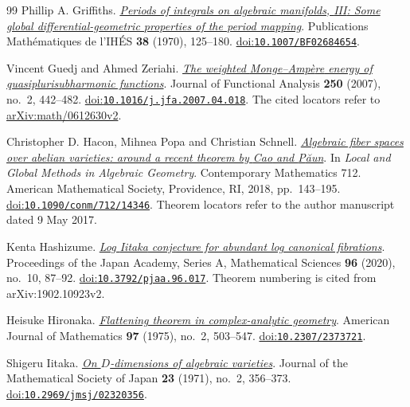 \begin{thebibliography}{99}
Phillip A. Griffiths.
\emph{\href{https://www.numdam.org/item/PMIHES_1970__38__125_0/}{Periods of integrals on algebraic manifolds, {III}: Some global differential-geometric properties of the period mapping}}.
Publications Math{\'e}matiques de l'IH{\'E}S \textbf{38} (1970), 125--180.
\href{https://doi.org/10.1007/BF02684654}{doi:\nolinkurl{10.1007/BF02684654}}.

Vincent Guedj and Ahmed Zeriahi.
\emph{\href{https://arxiv.org/abs/math/0612630v2}{The weighted {Monge--Amp{\`e}re} energy of quasiplurisubharmonic functions}}.
Journal of Functional Analysis \textbf{250} (2007), no.~2, 442--482.
\href{https://doi.org/10.1016/j.jfa.2007.04.018}{doi:\nolinkurl{10.1016/j.jfa.2007.04.018}}.
The cited locators refer to \href{https://arxiv.org/abs/math/0612630v2}{arXiv:math/0612630v2}.

Christopher D. Hacon, Mihnea Popa and Christian Schnell.
\emph{\href{https://people.math.harvard.edu/~mpopa/papers/HPS.pdf}{Algebraic fiber spaces over abelian varieties: around a recent theorem by {Cao} and {P{\u a}un}}}.
In \emph{Local and Global Methods in Algebraic Geometry}.
Contemporary Mathematics 712.
American Mathematical Society, Providence, RI, 2018, pp.~143--195.
\href{https://doi.org/10.1090/conm/712/14346}{doi:\nolinkurl{10.1090/conm/712/14346}}.
Theorem locators refer to the author manuscript dated 9 May 2017.

Kenta Hashizume.
\emph{\href{https://arxiv.org/abs/1902.10923v2}{Log {Iitaka} conjecture for abundant log canonical fibrations}}.
Proceedings of the Japan Academy, Series A, Mathematical Sciences \textbf{96} (2020), no.~10, 87--92.
\href{https://doi.org/10.3792/pjaa.96.017}{doi:\nolinkurl{10.3792/pjaa.96.017}}.
Theorem numbering is cited from arXiv:1902.10923v2.

Heisuke Hironaka.
\emph{\href{https://doi.org/10.2307/2373721}{Flattening theorem in complex-analytic geometry}}.
American Journal of Mathematics \textbf{97} (1975), no.~2, 503--547.
\href{https://doi.org/10.2307/2373721}{doi:\nolinkurl{10.2307/2373721}}.

Shigeru Iitaka.
\emph{\href{https://www.jstage.jst.go.jp/article/jmath1948/23/2/23_2_356/_article}{On {$D$}-dimensions of algebraic varieties}}.
Journal of the Mathematical Society of Japan \textbf{23} (1971), no.~2, 356--373.
\href{https://doi.org/10.2969/jmsj/02320356}{doi:\nolinkurl{10.2969/jmsj/02320356}}.


\end{thebibliography}
